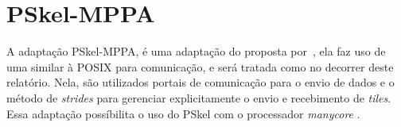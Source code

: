\section{PSkel-MPPA}
\label{subsec:pskel-mppa}

A adaptação PSkel-MPPA, é uma adaptação do \pskel proposta por~\cite{PodestaJr.2017}, ela faz uso de uma \api similar à POSIX \ipc para comunicação, e será tratada como \ipc no decorrer deste relatório. Nela, são utilizados portais de comunicação para o envio de dados e o método de \textit{strides}  para gerenciar explicitamente o envio e recebimento de \textit{tiles}. Essa adaptação possíbilita o uso do \fw PSkel com o processador \textit{manycore} \mppa.

